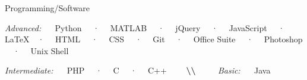 \begin{cventries}
  \cventry
    {Programming/Software}
    {}
    {}
    {}
    {
      \begin{cvitems}
        \item {\textit{Advanced:} ~~ Python ~~·~~ MATLAB ~~·~~ jQuery ~~·~~ JavaScript ~~·~~ \LaTeX ~~·~~ HTML ~~·~~ CSS ~~·~~ Git ~~·~~ Office Suite ~~·~~ Photoshop ~~·~~ Unix Shell}
        \item {\textit{Intermediate:} ~~ PHP ~~·~~ C ~~·~~ C++ ~~~~{\color{black!30}\textbf{\textbackslash\textbackslash}} ~~~~ \textit{Basic:} ~~ Java}
      \end{cvitems}
    }
    
\end{cventries}
